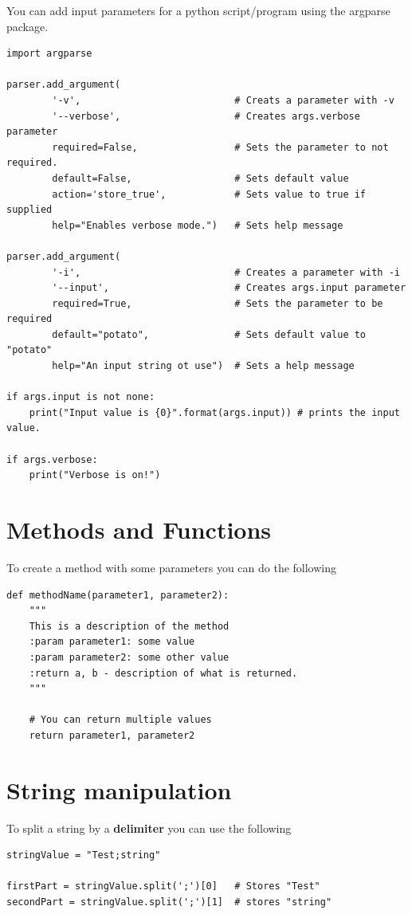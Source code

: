 You can add input parameters for a python script/program using the argparse package.
\begin{lstlisting}
import argparse

parser.add_argument(
		'-v',							# Creats a parameter with -v
		'--verbose',					# Creates args.verbose parameter
		required=False,					# Sets the parameter to not required.
		default=False,					# Sets default value
		action='store_true',			# Sets value to true if supplied
		help="Enables verbose mode.")	# Sets help message
					
parser.add_argument(
		'-i',							# Creates a parameter with -i
		'--input',						# Creates args.input parameter
		required=True,					# Sets the parameter to be required
		default="potato",				# Sets default value to "potato"
		help="An input string ot use")	# Sets a help message
		
if args.input is not none:
	print("Input value is {0}".format(args.input)) # prints the input value.
	
if args.verbose:
	print("Verbose is on!")
\end{lstlisting}





\section{Methods and Functions}

To create a method with some parameters you can do the following
\begin{lstlisting}
def methodName(parameter1, parameter2):
	"""
	This is a description of the method
	:param parameter1: some value
	:param parameter2: some other value
	:return a, b - description of what is returned.
	"""
	
	# You can return multiple values
	return parameter1, parameter2	
\end{lstlisting}



\section{String manipulation}

To split a string by a \textbf{delimiter} you can use the following
\begin{lstlisting}
stringValue = "Test;string"

firstPart = stringValue.split(';')[0] 	# Stores "Test"
secondPart = stringValue.split(';')[1]	# stores "string"
\end{lstlisting}



